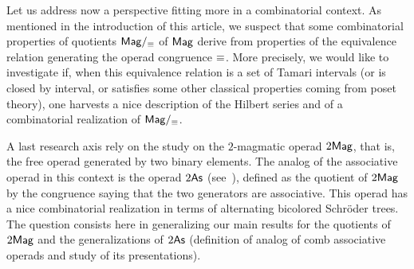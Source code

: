 Let us address now a perspective fitting more in a combinatorial
context. As mentioned in the introduction of this article, we suspect
that some combinatorial properties of quotients $\mathsf{Mag}/_{\operatorname{\equiv}}$ of
$\mathsf{Mag}$ derive from properties of the equivalence relation generating the
operad congruence $\operatorname{\equiv}$. More precisely, we would like to investigate
if, when this equivalence relation is a set of Tamari intervals (or is
closed by interval, or satisfies some other classical properties coming
from poset theory), one harvests a nice description of the Hilbert
series and of a combinatorial realization of $\mathsf{Mag}/_{\operatorname{\equiv}}$.
\medbreak

A last research axis rely on the study on the $2$-magmatic operad
$2\mathsf{Mag}$, that is, the free operad generated by two binary elements.
The analog of the associative operad in this context is the operad
$2\mathsf{As}$ (see~\cite{LR06}), defined as the quotient of $2\mathsf{Mag}$ by
the congruence saying that the two generators are associative. This
operad has a nice combinatorial realization in terms of alternating
bicolored Schröder trees. The question consists here in generalizing
our main results for the quotients of $2\mathsf{Mag}$ and the generalizations
of $2\mathsf{As}$ (definition of analog of comb associative operads and
study of its presentations).
\medbreak

